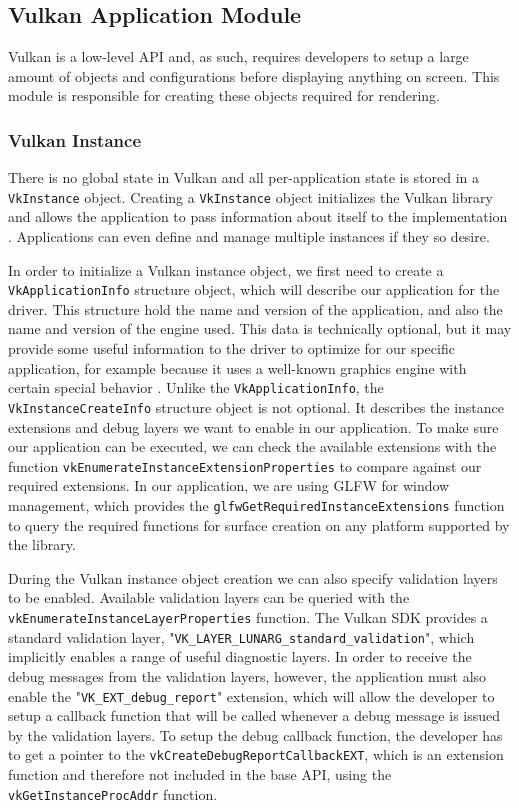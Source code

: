 \subsection{Vulkan Application Module}
Vulkan is a low-level API and, as such, requires developers to setup a large amount of objects and configurations before displaying anything on screen. This module is responsible for creating these objects required for rendering.

\subsubsection{Vulkan Instance}
There is no global state in Vulkan and all per-application state is stored in a \texttt{VkInstance} object. Creating a \texttt{VkInstance} object initializes the Vulkan library and allows the application to pass information about itself to the implementation \cite{vulkan_docs}. Applications can even define and manage multiple instances if they so desire.

In order to initialize a Vulkan instance object, we first need to create a \texttt{VkApplicationInfo} structure object, which will describe our application for the driver. This structure hold the name and version of the application, and also the name and version of the engine used. This data is technically optional, but it may provide some useful information to the driver to optimize for our specific application, for example because it uses a well-known graphics engine with certain special behavior \cite{vulkan_tutorial}. Unlike the \texttt{VkApplicationInfo}, the \texttt{VkInstanceCreateInfo} structure object is not optional. It describes the instance extensions and debug layers we want to enable in our application. To make sure our application can be executed, we can check the available extensions with the function \texttt{vkEnumerateInstanceExtensionProperties} to compare against our required extensions. In our application, we are using GLFW for window management, which provides the \texttt{glfwGetRequiredInstanceExtensions} function \cite{glfw_vulkan} to query the required functions for surface creation on any platform supported by the library.

During the Vulkan instance object creation we can also specify validation layers to be enabled. Available validation layers can be queried with the \texttt{vkEnumerateInstanceLayerProperties} function. The Vulkan SDK provides a standard validation layer, "\texttt{VK\_LAYER\_LUNARG\_standard\_validation}", which implicitly enables a range of useful diagnostic layers. In order to receive the debug messages from the validation layers, however, the application must also enable the "\texttt{VK\_EXT\_debug\_report}" extension, which will allow the developer to setup a callback function that will be called whenever a debug message is issued by the validation layers. To setup the debug callback function, the developer has to get a pointer to the \texttt{vkCreateDebugReportCallbackEXT}, which is an extension function and therefore not included in the base API, using the \texttt{vkGetInstanceProcAddr} function.

